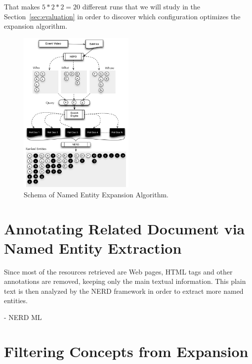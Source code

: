 \documentclass{llncs}
\begin{document}
That makes $5 * 2 * 2 = 20$ different runs that we will study in the Section~\ref{sec:evaluation} in order to discover which configuration optimizes the expansion algorithm.


\begin{figure}[h!]
\centering
\includegraphics[width=0.5\textwidth]{figure/ExpansionDiagram}
\caption{Schema of Named Entity Expansion Algorithm.}
\label{fig:namedEntityExpansion}%
\end{figure}


\section{Annotating Related Document via Named Entity Extraction}
\label{sec:NEAnnotation}

Since most of the resources retrieved are Web pages, HTML tags and other annotations are removed, keeping only the main textual information. This plain text is then analyzed by the NERD framework in order to extract more named entities.

- NERD ML 

\section{Filtering Concepts from Expansion}
\label{sec:Filtering}
\end{document}
